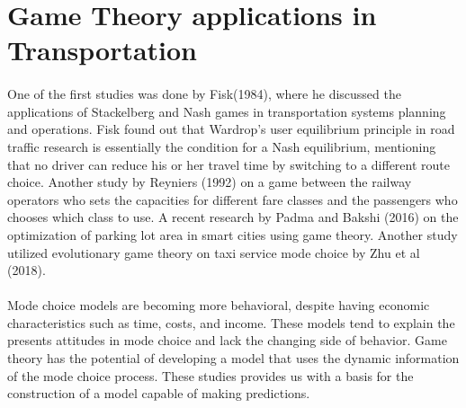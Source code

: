 \section{Game Theory applications in Transportation}
\paragraph{} One of the first studies was done by Fisk(1984), where he discussed the applications of Stackelberg and Nash games in transportation systems planning and operations. Fisk found out that Wardrop's user equilibrium principle in road traffic research is essentially the condition for a Nash equilibrium, mentioning that no driver can reduce his or her travel time by switching to a different route choice. Another study by Reyniers (1992) on a game between the railway operators who sets the capacities for different fare classes and the passengers who chooses which class to use. A recent research by Padma and Bakshi (2016) on the optimization of parking lot area in smart cities using game theory. Another study utilized evolutionary game theory on taxi service mode choice by Zhu et al (2018).  
\
\paragraph{}
Mode choice models are becoming more behavioral, despite having economic characteristics such as time, costs, and income.  These models tend to explain the presents attitudes in mode choice and lack the changing side of behavior. Game theory has the potential of developing a model that uses the dynamic information of the mode choice process. These studies provides us with a basis for the construction of a model capable of making predictions.